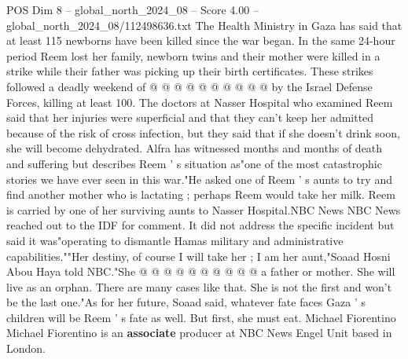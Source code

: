 \begin{textsample}{POS Dim 8 – global\_north\_2024\_08 – Score 4.00 – global\_north\_2024\_08/112498636.txt}
The Health Ministry in Gaza has said that at least 115 newborns have been killed since the war began.
In the same 24-hour period Reem lost her family, newborn twins and their mother were killed in a strike while their father was picking up their birth certificates.
These strikes followed a deadly weekend of @ @ @ @ @ @ @ @ @ @ by the Israel Defense Forces, killing at least 100.
The doctors at Nasser Hospital who examined Reem said that her injuries were superficial and that they can't keep her admitted because of the risk of cross infection, but they said that if she doesn't drink soon, she will become dehydrated.
Alfra has witnessed months and months of death and suffering but describes Reem ' s situation as"one of the most catastrophic stories we have ever seen in this war."He asked one of Reem ' s aunts to try and find another mother who is lactating ; perhaps Reem would take her milk.
Reem is carried by one of her surviving aunts to Nasser Hospital.NBC News NBC News reached out to the IDF for comment.
It did not address the specific incident but said it was"operating to dismantle Hamas military and administrative capabilities.""Her destiny, of course I will take her ; I am her aunt,"Soaad Hosni Abou Haya told NBC."She @ @ @ @ @ @ @ @ @ @ a father or mother.
She will live as an orphan.
There are many cases like that.
She is not the first and won't be the last one."As for her future, Soaad said, whatever fate faces Gaza ' s children will be Reem ' s fate as well.
But first, she must eat.
Michael Fiorentino Michael Fiorentino is an \textbf{associate} producer at NBC News Engel Unit based in London.

\end{textsample}
